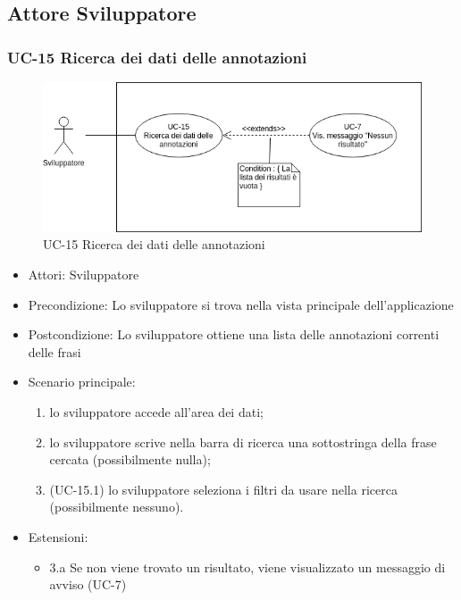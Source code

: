 \subsection{Attore Sviluppatore}

	\subsubsection{UC-15 Ricerca dei dati delle annotazioni}
		\begin{figure}[h]
			\centering
			\includegraphics[scale=0.7]{images/UC-15.png}
			\caption{UC-15 Ricerca dei dati delle annotazioni}
		\end{figure}			
	
		\begin{itemize}
			\item Attori: Sviluppatore
			\item Precondizione: Lo sviluppatore si trova nella vista principale dell'applicazione
			\item Postcondizione: Lo sviluppatore ottiene una lista delle annotazioni correnti delle frasi
			\item Scenario principale:
				\begin{enumerate}
					\item lo sviluppatore accede all'area dei dati;
					\item lo sviluppatore scrive nella barra di ricerca una sottostringa della frase cercata (possibilmente nulla);
					\item (UC-15.1) lo sviluppatore seleziona i filtri da usare nella ricerca (possibilmente nessuno).
				\end{enumerate}
			\item Estensioni:
				\begin{itemize}
					\item 3.a Se non viene trovato un risultato, viene visualizzato un messaggio di avviso (UC-7)
				\end{itemize}
		\end{itemize}

